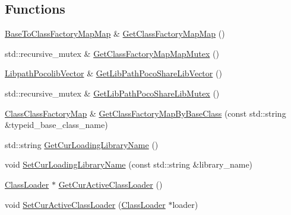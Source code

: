 \subsection*{Functions}
\begin{DoxyCompactItemize}
\item 
\hyperlink{namespaceapollo_1_1cyber_1_1class__loader_1_1utility_af56a53fd55c852ce98e9135bdff04cbc}{Base\-To\-Class\-Factory\-Map\-Map} \& \hyperlink{namespaceapollo_1_1cyber_1_1class__loader_1_1utility_ade8889a69d96abbc160abfb961e06e14}{Get\-Class\-Factory\-Map\-Map} ()
\item 
std\-::recursive\-\_\-mutex \& \hyperlink{namespaceapollo_1_1cyber_1_1class__loader_1_1utility_ac0762a456bf03c261dac3cbb887e766c}{Get\-Class\-Factory\-Map\-Map\-Mutex} ()
\item 
\hyperlink{namespaceapollo_1_1cyber_1_1class__loader_1_1utility_a1cb3907890434c1bb35adf496751b6f7}{Libpath\-Pocolib\-Vector} \& \hyperlink{namespaceapollo_1_1cyber_1_1class__loader_1_1utility_a7dd12e52ce22601d5745df656d76d971}{Get\-Lib\-Path\-Poco\-Share\-Lib\-Vector} ()
\item 
std\-::recursive\-\_\-mutex \& \hyperlink{namespaceapollo_1_1cyber_1_1class__loader_1_1utility_ac8ee63237d0ab29b318b85bb94578d4c}{Get\-Lib\-Path\-Poco\-Share\-Lib\-Mutex} ()
\item 
\hyperlink{namespaceapollo_1_1cyber_1_1class__loader_1_1utility_a4cf2c311509ec13f7d3c5d1516bcc590}{Class\-Class\-Factory\-Map} \& \hyperlink{namespaceapollo_1_1cyber_1_1class__loader_1_1utility_ae1fdfff70d24016decbc228c3154ca71}{Get\-Class\-Factory\-Map\-By\-Base\-Class} (const std\-::string \&typeid\-\_\-base\-\_\-class\-\_\-name)
\item 
std\-::string \hyperlink{namespaceapollo_1_1cyber_1_1class__loader_1_1utility_a5014c48715c314eb5f834c9757ae22b5}{Get\-Cur\-Loading\-Library\-Name} ()
\item 
void \hyperlink{namespaceapollo_1_1cyber_1_1class__loader_1_1utility_a9a6ff61f249d956b25d4534d24bd51eb}{Set\-Cur\-Loading\-Library\-Name} (const std\-::string \&library\-\_\-name)
\item 
\hyperlink{classapollo_1_1cyber_1_1class__loader_1_1ClassLoader}{Class\-Loader} $\ast$ \hyperlink{namespaceapollo_1_1cyber_1_1class__loader_1_1utility_aeee0d4fa36114f12c222715f07314fa4}{Get\-Cur\-Active\-Class\-Loader} ()
\item 
void \hyperlink{namespaceapollo_1_1cyber_1_1class__loader_1_1utility_a88712dc69a4b979a0e6d45c27ae023df}{Set\-Cur\-Active\-Class\-Loader} (\hyperlink{classapollo_1_1cyber_1_1class__loader_1_1ClassLoader}{Class\-Loader} $\ast$loader)

\end{DoxyCompactItemize}
